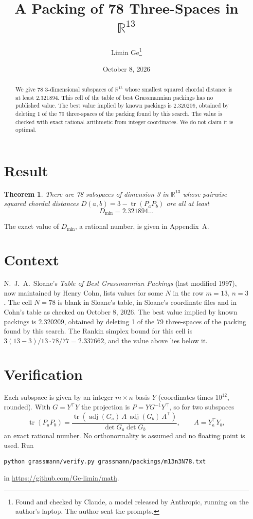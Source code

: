\documentclass[11pt,a4paper]{article}
\title{A Packing of 78 Three-Spaces in $\mathbb{R}^{13}$}
\author{Limin Ge\thanks{Found and checked by Claude, a model released by Anthropic, running on the author's laptop. The author sent the prompts.}}
\date{October 8, 2026}
\newtheorem*{theorem}{Theorem}
\begin{document}
\maketitle
\begin{abstract}
We give 78 3-dimensional subspaces of $\mathbb{R}^{13}$ whose smallest squared chordal distance is at least 2.321894. This cell of the table of best Grassmannian packings has no published value. The best value implied by known packings is 2.320209, obtained by deleting 1 of the 79 three-spaces of the packing found by this search. The value is checked with exact rational arithmetic from integer coordinates. We do not claim it is optimal.
\end{abstract}

\section{Result}
\begin{theorem}
There are 78 subspaces of dimension 3 in $\mathbb{R}^{13}$ whose pairwise squared chordal distances $D(a,b) = 3 - \operatorname{tr}(P_aP_b)$ are all at least
\[ D_{\min} = 2.321894\ldots \]
\end{theorem}
The exact value of $D_{\min}$, a rational number, is given in Appendix~A.


\section{Context}
N.~J.~A.~Sloane's \emph{Table of Best Grassmannian Packings} (last modified 1997), now maintained by Henry Cohn, lists values for some $N$ in the row $m=13$, $n=3$. The cell $N=78$ is blank in Sloane's table, in Sloane's coordinate files and in Cohn's table as checked on October 8, 2026. The best value implied by known packings is 2.320209, obtained by deleting 1 of the 79 three-spaces of the packing found by this search. The Rankin simplex bound for this cell is $3(13-3)/13\cdot 78/77 = 2.337662$, and the value above lies below it.


\section{Verification}
Each subspace is given by an integer $m\times n$ basis $Y$ (coordinates times $10^{12}$, rounded). With $G=Y^\top Y$ the projection is $P=YG^{-1}Y^\top$, so for two subspaces
\[ \operatorname{tr}(P_aP_b)=\frac{\operatorname{tr}(\operatorname{adj}(G_a)\,A\,\operatorname{adj}(G_b)\,A^\top)}{\det G_a\det G_b},\qquad A=Y_a^\top Y_b, \]
an exact rational number. No orthonormality is assumed and no floating point is used. Run
\begin{verbatim}
python grassmann/verify.py grassmann/packings/m13n3N78.txt
\end{verbatim}
in \url{https://github.com/Ge-limin/math}.
\end{document}
